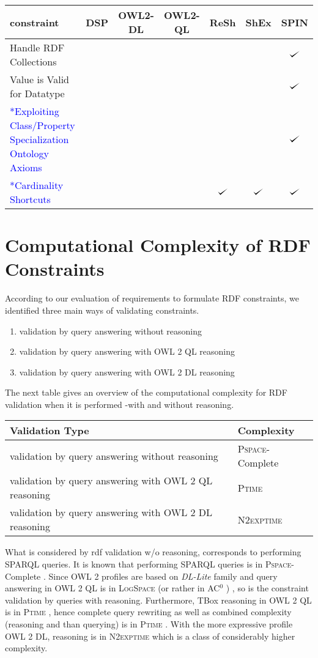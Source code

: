\documentclass{llncs}
\def\checkmark{\tikz\fill[scale=0.4](0,.35) -- (.25,0) -- (1,.7) -- (.25,.15) -- cycle;}
\newenvironment{complexity}{
  \scriptsize
  \sffamily
  \vspace{0.3cm}
  \begin{tabular}{l|l}
  \hline
  \textbf{Validation Type} & \textbf{Complexity} \\
  \hline

}{
  \hline
  \end{tabular}
  \linebreak
}
\newenvironment{evaluation}{
  \scriptsize
  \sffamily
  \vspace{0.3cm}
  \begin{tabular}{l|c|c|c|c|c|c}
  \hline
  \textbf{constraint} & \textbf{DSP} & \textbf{OWL2-DL} & \textbf{OWL2-QL} & \textbf{ReSh} & \textbf{ShEx} & \textbf{SPIN} \\
  \hline

}{
  \hline
  \end{tabular}
  \linebreak
}
\begin{document}
\begin{evaluation}
Handle RDF Collections & \ding{55} & \ding{55} & \ding{55} & \ding{55} & \ding{55} & $\checkmark$ \\
Value is Valid for Datatype & \ding{55} & \ding{55} & \ding{55} & \ding{55} & \ding{55} & $\checkmark$ \\
\textcolor{blue}{*Exploiting Class/Property Specialization Ontology Axioms} & \ding{55} & \ding{55} & \ding{55} & \ding{55} & \ding{55} & $\checkmark$ \\
\textcolor{blue}{*Cardinality Shortcuts} & \ding{55} & \ding{55} & \ding{55} & $\checkmark$ & $\checkmark$ & $\checkmark$ \\
\end{evaluation}

\section{Computational Complexity of RDF Constraints}

According to our evaluation of requirements to formulate RDF constraints, we identified three main ways of validating constraints.

\begin{enumerate}
	\item validation by query answering without reasoning
	\item validation by query answering with OWL 2 QL reasoning
	\item validation by query answering with OWL 2 DL reasoning
\end{enumerate}

The next table gives an overview of the computational complexity for RDF validation when it is performed -with and without reasoning. 

\begin{complexity}
validation by query answering without reasoning & \textsc{Pspace}-Complete \\
validation by query answering with OWL 2 QL reasoning & \textsc{Ptime} \\
validation by query answering with OWL 2 DL reasoning & \textsc{N2exptime} \\
\end{complexity}


What is considered by rdf validation w/o reasoning, corresponds to performing SPARQL queries.  It is known that performing SPARQL queries is in \textsc{Pspace}-Complete \cite{Perez2009}. Since OWL 2 profiles are based on \textit{DL-Lite} family and query answering in OWL 2 QL is in \textsc{LogSpace} (or rather in AC$^0$ ) \cite{Calvanese2007}, so is the constraint validation by queries with  reasoning. Furthermore, TBox reasoning in OWL 2 QL is in \textsc{Ptime} \cite{Calvanese2007}, hence complete query rewriting as well as combined complexity (reasoning and than querying) is in \textsc{Ptime} \cite{Artale2009,Calvanese2007}.  With the more expressive profile OWL 2 DL, reasoning is in \textsc{N2exptime} \cite{owl2profiles2008} which is a class of considerably higher complexity.
\end{document}

